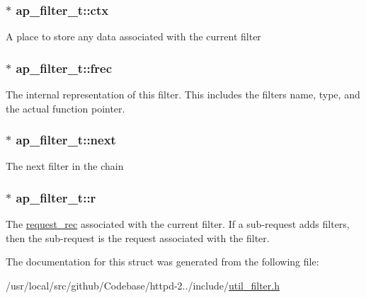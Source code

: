 \subsubsection[{\texorpdfstring{ctx}{ctx}}]{$\ast$ ap\+\_\+filter\+\_\+t\+::ctx}\hypertarget{structap__filter__t_aef5a2ef40157f704d2b573b8737a6a70}{}\label{structap__filter__t_aef5a2ef40157f704d2b573b8737a6a70}
A place to store any data associated with the current filter 
\subsubsection[{\texorpdfstring{frec}{frec}}]{$\ast$ ap\+\_\+filter\+\_\+t\+::frec}\hypertarget{structap__filter__t_a8eb5e0c9ade0302a2d024f01d70e9c07}{}\label{structap__filter__t_a8eb5e0c9ade0302a2d024f01d70e9c07}
The internal representation of this filter. This includes the filter\textquotesingle{}s name, type, and the actual function pointer. 
\subsubsection[{\texorpdfstring{next}{next}}]{$\ast$ ap\+\_\+filter\+\_\+t\+::next}\hypertarget{structap__filter__t_af4835ed2c41734061dc374d92ba401a2}{}\label{structap__filter__t_af4835ed2c41734061dc374d92ba401a2}
The next filter in the chain 
\subsubsection[{\texorpdfstring{r}{r}}]{$\ast$ ap\+\_\+filter\+\_\+t\+::r}\hypertarget{structap__filter__t_a2d6537780c4059697c1f168a1121d62c}{}\label{structap__filter__t_a2d6537780c4059697c1f168a1121d62c}
The \hyperlink{structrequest__rec}{request\+\_\+rec} associated with the current filter. If a sub-\/request adds filters, then the sub-\/request is the request associated with the filter. 

The documentation for this struct was generated from the following file\+:\begin{DoxyCompactItemize}
\item 
/usr/local/src/github/\+Codebase/httpd-\/2../include/\hyperlink{util__filter_8h}{util\+\_\+filter.\+h}\end{DoxyCompactItemize}
